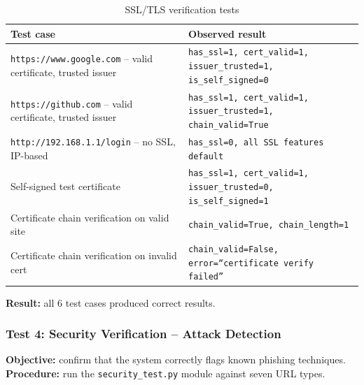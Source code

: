 \documentclass[11pt,a4paper]{article}
\begin{document}
\begin{table}[H]
\centering
\small
\begin{tabularx}{\textwidth}{@{}Lp{6.5cm}@{}}
\toprule
\textbf{Test case} & \textbf{Observed result} \\ \midrule
\texttt{https://www.google.com} -- valid certificate, trusted issuer & \texttt{has\_ssl=1, cert\_valid=1, issuer\_trusted=1, is\_self\_signed=0} \\
\texttt{https://github.com} -- valid certificate, trusted issuer & \texttt{has\_ssl=1, cert\_valid=1, issuer\_trusted=1, chain\_valid=True} \\
\texttt{http://192.168.1.1/login} -- no SSL, IP-based & \texttt{has\_ssl=0, all SSL features default} \\
Self-signed test certificate & \texttt{has\_ssl=1, cert\_valid=1, issuer\_trusted=0, is\_self\_signed=1} \\
Certificate chain verification on valid site & \texttt{chain\_valid=True, chain\_length=1} \\
Certificate chain verification on invalid cert & \texttt{chain\_valid=False, error=``certificate verify failed''} \\ \bottomrule
\end{tabularx}
\caption{SSL/TLS verification tests}
\end{table}

\textbf{Result:} all 6 test cases produced correct results.

\subsubsection{Test 4: Security Verification -- Attack Detection}

\textbf{Objective:} confirm that the system correctly flags known phishing techniques.\\
\textbf{Procedure:} run the \texttt{security\_test.py} module against seven URL types.
\end{document}
